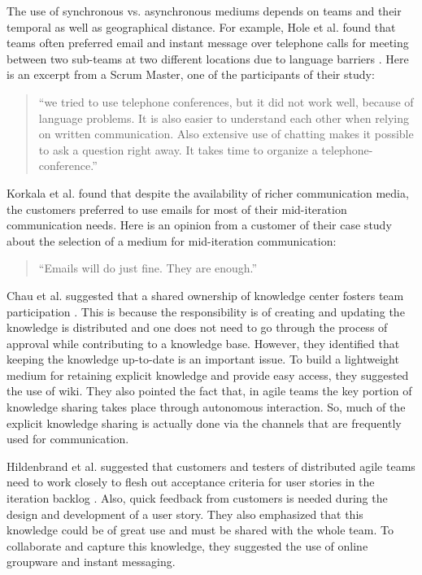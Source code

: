 The use of synchronous vs. asynchronous mediums depends on teams and their temporal as well as geographical distance. For example, Hole et al. found that teams often preferred email and instant message over telephone calls for meeting between two sub-teams at two different locations due to language barriers \cite{a_case_study_of}. Here is an excerpt from a Scrum Master, one of the participants of their study:\\

\begin{quote}
``we tried to use telephone conferences, but it did not work well, because of language problems. It is also easier to understand each other when relying on written communication. Also extensive use of chatting makes it possible to ask a question right away. It takes time to organize a telephone-conference.''
\end{quote}

Korkala et al. found that despite the availability of richer communication media, the customers preferred to use emails for most of their mid-iteration communication needs\cite{communication_in_distributed}. Here is an opinion from a customer of their case study about the selection of a medium for mid-iteration communication:\\
\begin{quote}
	``Emails will do just fine. They are enough.''
\end{quote}

Chau et al. suggested that a shared ownership of knowledge center fosters team participation \cite{knowledge_sharing}. This is because the responsibility is of creating and updating the knowledge is distributed and one does not need to go through the process of approval while contributing to a knowledge base. However, they identified that keeping the knowledge up-to-date is an important issue. To build a lightweight medium for retaining explicit knowledge and provide easy access, they suggested the use of wiki. They also pointed the fact that, in agile teams the key portion of knowledge sharing takes place through autonomous interaction. So, much of the explicit knowledge sharing is actually done via the channels that are frequently used for communication.

Hildenbrand et al. suggested that customers and testers of distributed agile teams need to work closely to flesh out acceptance criteria for user stories in the iteration backlog \cite{agile_methods}. Also, quick feedback from customers is needed during the design and development of a user story. They also emphasized that this knowledge could be of great use and must be shared with the whole team. To collaborate and capture this knowledge, they suggested the use of online groupware and instant messaging.

